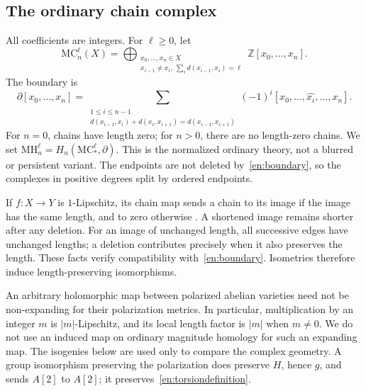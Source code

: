 \documentclass[12pt]{amsart}
\theoremstyle{definition}
\theoremstyle{remark}
\numberwithin{equation}{section}
\newcommand{\Z}{\mathbb{Z}}
\newcommand{\MH}{\mathrm{MH}}
\newcommand{\MC}{\mathrm{MC}}
\begin{document}
\subsection{The ordinary chain complex}
All coefficients are integers. For $\ell\geq0$, let
\begin{equation}\label{en:chains}
\MC_n^\ell(X)=
\bigoplus_{\substack{x_0,\ldots,x_n\in X\\
x_{i-1}\ne x_i,\ \sum_i d(x_{i-1},x_i)=\ell}}
\Z[x_0,\ldots,x_n].
\end{equation}
The boundary is
\begin{equation}\label{en:boundary}
\partial[x_0,\ldots,x_n]=
\sum_{\substack{1\leq i\leq n-1\\
d(x_{i-1},x_i)+d(x_i,x_{i+1})=d(x_{i-1},x_{i+1})}}
(-1)^i[x_0,\ldots,\widehat{x_i},\ldots,x_n].
\end{equation}
For $n=0$, chains have length zero; for $n>0$, there are no length-zero chains. We set $\MH_n^\ell=H_n(\MC_*^\ell,\partial)$. This is the normalized ordinary theory, not a blurred or persistent variant. The endpoints are not deleted by~\eqref{en:boundary}, so the complexes in positive degrees split by ordered endpoints.

If $f:X\to Y$ is $1$-Lipschitz, its chain map sends a chain to its image if the image has the same length, and to zero otherwise \cite[\S1.3]{en:BK}. A shortened image remains shorter after any deletion. For an image of unchanged length, all successive edges have unchanged lengths; a deletion contributes precisely when it also preserves the length. These facts verify compatibility with~\eqref{en:boundary}. Isometries therefore induce length-preserving isomorphisms.

An arbitrary holomorphic map between polarized abelian varieties need not be non-expanding for their polarization metrics. In particular, multiplication by an integer $m$ is $|m|$-Lipschitz, and its local length factor is $|m|$ when $m\ne0$. We do not use an induced map on ordinary magnitude homology for such an expanding map. The isogenies below are used only to compare the complex geometry. A group isomorphism preserving the polarization does preserve $H$, hence $g$, and sends $A[2]$ to $A[2]$; it preserves~\eqref{en:torsiondefinition}.
\end{document}
